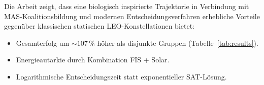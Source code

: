 ﻿\documentclass[a4paper,12pt]{article}
\theoremstyle{definition}
\begin{document}
Die Arbeit zeigt, dass eine biologisch inspirierte Trajektorie in Verbindung
mit MAS-Koalitionsbildung und modernen Entscheidungsverfahren erhebliche
Vorteile gegen\"uber klassischen statischen LEO-Konstellationen bietet:
\begin{itemize}
  \item Gesamterfolg um $\sim 107\,\%$ h\"oher als disjunkte Gruppen (Tabelle~\ref{tab:results}).
  \item Energieautarkie durch Kombination FIS + Solar.
  \item Logarithmische Entscheidungszeit statt exponentieller SAT-L\"osung.
\end{itemize}


\end{document}
